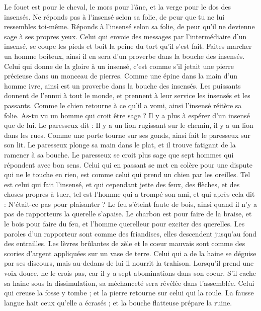 \begin{multicols}{2}
Le fouet est pour le cheval, le mors pour l'âne, et la verge pour le dos des insensés.
Ne réponds pas  à l’insensé selon sa folie, de peur que tu ne lui ressembles toi-même.
Réponds à l’insensé selon sa folie, de peur qu'il ne devienne sage à ses propres yeux.
Celui qui envoie des messages par l’intermédiaire d’un insensé, se coupe les pieds et boit la peine du tort qu'il s'est fait.
Faites marcher un homme boiteux, ainsi il en sera d'un proverbe dans la bouche des insensés.
Celui qui donne de la gloire à un insensé, c’est comme s'il jetait une pierre précieuse dans un monceau de pierres.
Comme une épine dans la main d'un homme ivre, ainsi est un proverbe dans la bouche des insensés.
Les puissants donnent de l'ennui à tout le monde, et prennent à leur service les insensés et les passants.
Comme le chien retourne à ce qu'il a vomi, ainsi l’insensé réitère sa folie.
As-tu vu un homme qui croit être sage ? Il y a plus à espérer d'un insensé que de lui.
Le paresseux dit : Il y a un lion rugissant sur le chemin, il y a un lion dans les rues.
Comme une porte tourne sur ses gonds, ainsi fait le paresseux sur son lit.
Le paresseux plonge sa main dans le plat, et il trouve fatigant de la ramener à sa bouche.
Le paresseux se croit plus sage que sept hommes qui répondent avec bon sens.
Celui qui en passant se met en colère pour une dispute qui ne le touche en rien, est comme celui qui prend un chien par les oreilles.
Tel est celui qui fait l'insensé, et qui cependant jette des feux, des flèches, et des choses propres à tuer,
tel est l'homme qui a trompé son ami, et qui après cela dit : N’était-ce pas pour plaisanter ?
Le feu s'éteint faute de bois, ainsi quand il n'y a pas de rapporteurs la querelle s'apaise.
Le charbon est pour faire de la braise, et le bois pour faire du feu, et l'homme querelleur pour exciter des querelles.
Les paroles d'un rapporteur sont comme des friandises, elles descendent jusqu'au fond des entrailles.
Les lèvres brûlantes de zèle et le coeur mauvais sont comme des scories d’argent appliquées sur un vase de terre.
Celui qui a de la haine se déguise par ses discours, mais au-dedans de lui il nourrit la trahison.
Lorsqu’il prend une voix douce, ne le crois pas, car il y a sept abominations dans son coeur.
S’il cache sa haine sous la dissimulation, sa méchanceté sera révélée dans l'assemblée.
Celui qui creuse la fosse y tombe ; et la pierre retourne sur celui qui la roule.
La fausse langue hait ceux qu'elle a écrasés ; et la bouche flatteuse prépare la ruine.

\end{multicols}
